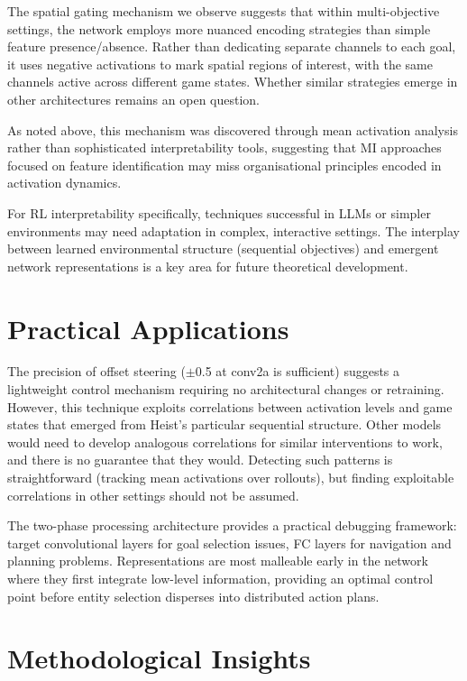 The spatial gating mechanism we observe suggests that within multi-objective settings, the network employs more nuanced encoding strategies than simple feature presence/absence. Rather than dedicating separate channels to each goal, it uses negative activations to mark spatial regions of interest, with the same channels active across different game states. Whether similar strategies emerge in other architectures remains an open question.

As noted above, this mechanism was discovered through mean activation analysis rather than sophisticated interpretability tools, suggesting that MI approaches focused on feature identification may miss organisational principles encoded in activation dynamics.

For RL interpretability specifically, techniques successful in LLMs or simpler environments may need adaptation in complex, interactive settings. The interplay between learned environmental structure (sequential objectives) and emergent network representations is a key area for future theoretical development.

\section{Practical Applications}\label{sec:applications}

The precision of offset steering ($\pm$0.5 at conv2a is sufficient) suggests a lightweight control mechanism requiring no architectural changes or retraining. However, this technique exploits correlations between activation levels and game states that emerged from Heist's particular sequential structure. Other models would need to develop analogous correlations for similar interventions to work, and there is no guarantee that they would. Detecting such patterns is straightforward (tracking mean activations over rollouts), but finding exploitable correlations in other settings should not be assumed.

The two-phase processing architecture provides a practical debugging framework: target convolutional layers for goal selection issues, FC layers for navigation and planning problems. Representations are most malleable early in the network where they first integrate low-level information, providing an optimal control point before entity selection disperses into distributed action plans.

\section{Methodological Insights}\label{sec:reflections}

